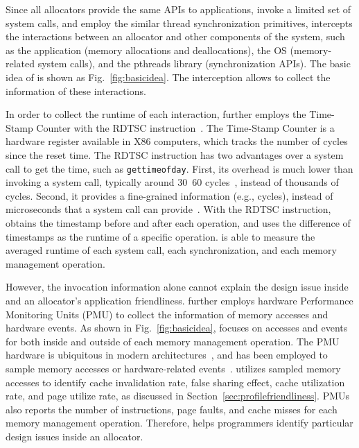 Since all allocators provide the same APIs to applications, invoke a limited set of system calls, and employ the similar thread synchronization primitives, \MP{} intercepts the interactions between an allocator and other components of the system, such as the application (memory allocations and deallocations), the OS (memory-related system calls), and the pthreads library (synchronization APIs). The basic idea of \MP{} is shown as Fig.~\ref{fig:basicidea}. The interception allows \MP{} to collect the information of these interactions. 

In order to collect the runtime of each interaction, \MP{} further employs the Time-Stamp Counter with the RDTSC instruction~\cite{coorporation1997using}. The Time-Stamp Counter is a hardware register available in X86 computers, which tracks the number of cycles since the reset time. The RDTSC instruction has two advantages over a system call to get the time, such as \texttt{gettimeofday}. First, its overhead is much lower than invoking a system call, typically around 30~60  cycles~\cite{rdtscoverhead}, instead of thousands of cycles. Second, it provides a fine-grained information (e.g., cycles), instead of microseconds that a system call can provide~\cite{pitfallsrdtsc}. With the RDTSC instruction, \MP{} obtains the timestamp before and after each operation, and uses the difference of timestamps as the runtime of a specific operation. \MP{} is able to measure the averaged runtime of each system call, each synchronization, and each memory management operation. 

However, the invocation information alone cannot  explain the design issue inside and an allocator's application friendliness. \MP{} further employs hardware Performance Monitoring Units (PMU) to collect the information of memory accesses and hardware events. As shown in Fig.~\ref{fig:basicidea}, \MP{} focuses on accesses and events for both inside and outside of each memory management operation. The PMU hardware is ubiquitous in modern architectures~\cite{AMDIBS:07, IntelArch:PEBS:Sept09, armpmu}, and has been  employed to sample memory accesses or hardware-related events~\cite{DBLP:conf/sc/ItzkowitzWAK03, ibs-sc, Sheng:2011:RLN:1985793.1985848}.
\MP{} utilizes sampled memory accesses to identify cache invalidation rate, false sharing effect, cache utilization rate, and page utilize rate, as discussed in Section~\ref{sec:profilefriendliness}. PMUs also reports the number of instructions, page faults, and cache misses for each memory management operation. Therefore, \MP{} helps programmers identify particular design issues inside an allocator. 

